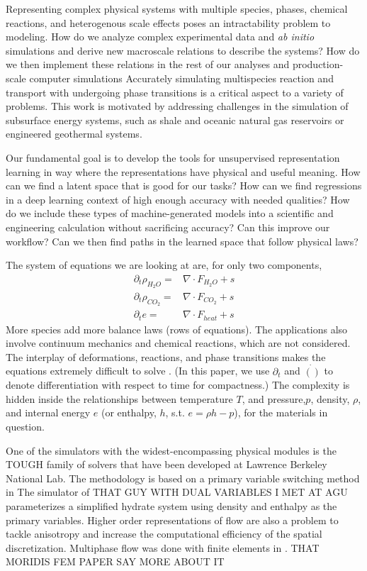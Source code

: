 \documentclass[AMA,STIX1COL]{WileyNJD-v2}
\begin{document}
Representing complex physical systems with multiple species, phases,
chemical reactions, and heterogenous scale effects poses an
intractability problem to modeling. How do we analyze complex
experimental data and \emph{ab initio} simulations and derive new
macroscale relations to describe the systems? How do we then implement
these relations in the rest of our analyses and production-scale
computer simulations
Accurately simulating multispecies reaction and transport with
undergoing phase transitions is a critical aspect to a variety of
problems.
This work is motivated by addressing challenges in the simulation of subsurface energy systems, such as shale
and oceanic natural gas reservoirs or engineered geothermal
systems.

Our fundamental goal is to develop the tools
for unsupervised representation learning in way where the
representations have physical and useful meaning.
How can we find a latent space that is good for our tasks?
How can we find regressions in a deep learning context of high enough
accuracy with needed qualities?
How do we include these types of machine-generated models into a
scientific and engineering calculation without sacrificing accuracy?
Can this improve our workflow?
Can we then find paths in the learned space that follow physical laws?


The system of equations we are looking at are, for only two components,
\begin{align}
  \partial_t \rho_{H_2O} =& \nabla \cdot F_{H_2O} + s \\
  \partial_t \rho_{CO_2} =& \nabla \cdot F_{CO_2} + s \\
  \partial_t e =& \nabla \cdot F_{heat} + s
\end{align}
More species add more balance laws (rows of equations). The applications also involve continuum
mechanics and chemical reactions, which are not considered. The interplay of deformations,
reactions, and phase transitions makes the equations extremely difficult
to solve \cite{queiruga_simulation_2019}. 
(In this paper, we use $\partial_t$
and $\dot{()}$ to denote differentiation with respect to time
for compactness.)
The complexity is hidden inside the relationships between temperature
$T$, and pressure,$p$, density, $\rho$, and internal energy $e$ (or
enthalpy, $h$, s.t. $e=\rho h - p$), 
for the materials in question.

One of the simulators with the widest-encompassing physical modules is
the TOUGH family of solvers that have been developed at Lawrence
Berkeley National Lab.
The methodology is based on a primary variable switching method in 
The simulator of THAT GUY WITH DUAL VARIABLES I MET AT AGU
parameterizes a simplified hydrate system using density and enthalpy
as the primary variables.
Higher order representations of flow are also a problem to tackle
anisotropy and increase the computational efficiency of the spatial
discretization\cite{hannon_enhanced_2018}. 
Multiphase flow was done with finite elements in \cite{yang_fully_2014}.
THAT MORIDIS FEM PAPER SAY MORE ABOUT IT
\end{document}
